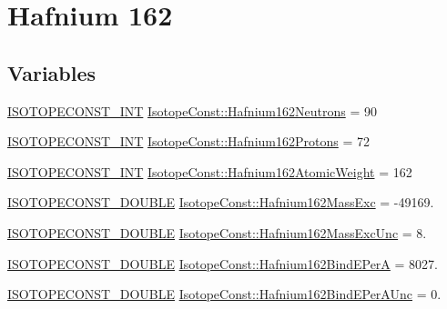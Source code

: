 \hypertarget{group___isotope_const-_hafnium-_hf162}{}\section{Hafnium 162}
\label{group___isotope_const-_hafnium-_hf162}
\subsection*{Variables}
\begin{DoxyCompactItemize}
\item 
\mbox{\hyperlink{group___isotope_const-_macros_ga5f18360b3e99483a35c32d789e62621c}{I\+S\+O\+T\+O\+P\+E\+C\+O\+N\+S\+T\+\_\+\+I\+NT}} \mbox{\hyperlink{group___isotope_const-_hafnium-_hf162_ga04d5cf954811cf058b3b3c68d3d3d1bf}{Isotope\+Const\+::\+Hafnium162\+Neutrons}} = 90
\item 
\mbox{\hyperlink{group___isotope_const-_macros_ga5f18360b3e99483a35c32d789e62621c}{I\+S\+O\+T\+O\+P\+E\+C\+O\+N\+S\+T\+\_\+\+I\+NT}} \mbox{\hyperlink{group___isotope_const-_hafnium-_hf162_ga0f87cad9c56699399967226c63ed2a5b}{Isotope\+Const\+::\+Hafnium162\+Protons}} = 72
\item 
\mbox{\hyperlink{group___isotope_const-_macros_ga5f18360b3e99483a35c32d789e62621c}{I\+S\+O\+T\+O\+P\+E\+C\+O\+N\+S\+T\+\_\+\+I\+NT}} \mbox{\hyperlink{group___isotope_const-_hafnium-_hf162_gaffd6caa7edcc08c265b0af2222c9779a}{Isotope\+Const\+::\+Hafnium162\+Atomic\+Weight}} = 162
\item 
\mbox{\hyperlink{group___isotope_const-_macros_ga8f45a7272ce02c0b4c65c44636ed719a}{I\+S\+O\+T\+O\+P\+E\+C\+O\+N\+S\+T\+\_\+\+D\+O\+U\+B\+LE}} \mbox{\hyperlink{group___isotope_const-_hafnium-_hf162_ga4d706e1cc1a6bc1a319b461483d44f48}{Isotope\+Const\+::\+Hafnium162\+Mass\+Exc}} = -\/49169.
\item 
\mbox{\hyperlink{group___isotope_const-_macros_ga8f45a7272ce02c0b4c65c44636ed719a}{I\+S\+O\+T\+O\+P\+E\+C\+O\+N\+S\+T\+\_\+\+D\+O\+U\+B\+LE}} \mbox{\hyperlink{group___isotope_const-_hafnium-_hf162_ga26c0c1cd7f94489e3d6f2abec7acdb5c}{Isotope\+Const\+::\+Hafnium162\+Mass\+Exc\+Unc}} = 8.
\item 
\mbox{\hyperlink{group___isotope_const-_macros_ga8f45a7272ce02c0b4c65c44636ed719a}{I\+S\+O\+T\+O\+P\+E\+C\+O\+N\+S\+T\+\_\+\+D\+O\+U\+B\+LE}} \mbox{\hyperlink{group___isotope_const-_hafnium-_hf162_gac22c965b0e55b7de5ead6d644ddb8ca5}{Isotope\+Const\+::\+Hafnium162\+Bind\+E\+PerA}} = 8027.
\item 
\mbox{\hyperlink{group___isotope_const-_macros_ga8f45a7272ce02c0b4c65c44636ed719a}{I\+S\+O\+T\+O\+P\+E\+C\+O\+N\+S\+T\+\_\+\+D\+O\+U\+B\+LE}} \mbox{\hyperlink{group___isotope_const-_hafnium-_hf162_gaf1e941605b13fd0f30f95a2ee60a04f6}{Isotope\+Const\+::\+Hafnium162\+Bind\+E\+Per\+A\+Unc}} = 0.

\end{DoxyCompactItemize}
